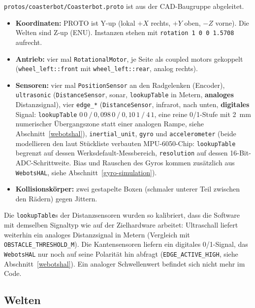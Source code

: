 \documentclass[
  a4paper,
  12pt,
  DIV=12,        %
  parskip=half,  %
  headings=small %
]{scrartcl}
\theoremstyle{definition}
\providecommand{\tightlist}{%
  \setlength{\itemsep}{0pt}\setlength{\parskip}{0pt}}
\theoremstyle{definition}
\begin{document}
\texttt{protos/coasterbot/Coasterbot.proto} ist aus der
CAD-Baugruppe abgeleitet.

\begin{itemize}
\tightlist
\item
  \textbf{Koordinaten:} PROTO ist Y-up (lokal $+X$ rechts, $+Y$ oben,
  $-Z$ vorne). Die Welten sind Z-up (ENU). Instanzen stehen mit
  \texttt{rotation 1 0 0 1.5708} aufrecht.
\item
  \textbf{Antrieb:} vier mal \texttt{RotationalMotor}, je Seite als coupled
  motors gekoppelt (\texttt{wheel\_left::front} mit
  \texttt{wheel\_left::rear}, analog rechts).
\item
  \textbf{Sensoren:} vier mal \texttt{PositionSensor} an den Radgelenken
  (Encoder), \texttt{ultrasonic} (\texttt{DistanceSensor}, sonar,
  \texttt{lookupTable} in Metern, \textbf{analoges} Distanzsignal), vier
  \texttt{edge\_*} (\texttt{DistanceSensor}, infrarot, nach unten,
  \textbf{digitales} Signal: \texttt{lookupTable}
  $0\,0\ /\ 0{,}098\,0\ /\ 0{,}10\,1\ /\ 4\,1$, eine reine \num{0}/\num{1}-Stufe
  mit \SI{2}{\milli\meter} numerischer Übergangszone statt einer analogen
  Rampe, siehe Abschnitt~\ref{webotshal}), \texttt{inertial\_unit},
  \texttt{gyro} und \texttt{accelerometer} (beide modellieren den
  laut Stückliste verbauten MPU-6050-Chip: \texttt{lookupTable}
  begrenzt auf dessen Werksdefault-Messbereich, \texttt{resolution}
  auf dessen 16-Bit-ADC-Schrittweite. Bias und Rauschen des Gyros
  kommen zusätzlich aus \texttt{WebotsHAL}, siehe
  Abschnitt~\ref{gyro-simulation}).
\item
  \textbf{Kollisionskörper:} zwei gestapelte Boxen (schmaler
  unterer Teil zwischen den Rädern) gegen Jittern.
\end{itemize}

Die \texttt{lookupTable}s der Distanzsensoren wurden so kalibriert, dass
die Software mit demselben Signaltyp wie auf der Zielhardware arbeitet:
Ultraschall liefert weiterhin ein analoges Distanzsignal in Metern
(Vergleich mit \texttt{OBSTACLE\_THRESHOLD\_M}). Die Kantensensoren
liefern ein digitales \num{0}/\num{1}-Signal, das \texttt{WebotsHAL} nur
noch auf seine Polarität hin abfragt (\texttt{EDGE\_ACTIVE\_HIGH}, siehe
Abschnitt~\ref{webotshal}). Ein analoger Schwellenwert befindet sich nicht
mehr im Code.

\subsection{Welten}\label{welten}
\end{document}
